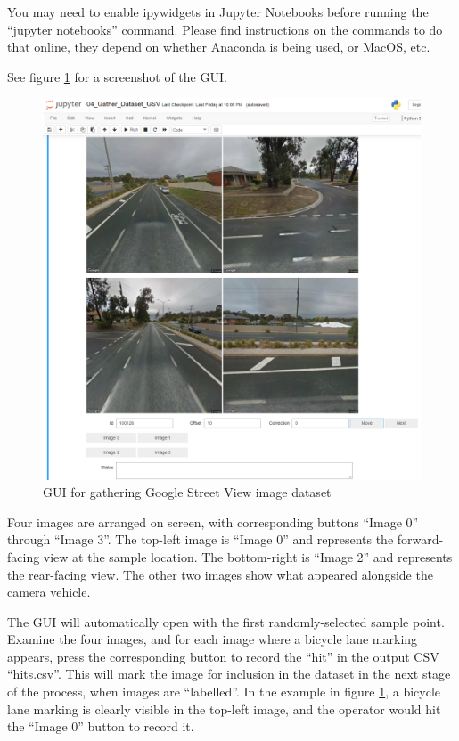 \documentclass[11pt,twoside]{report}
\begin{document}
You may need to enable ipywidgets in Jupyter Notebooks before running the ``jupyter notebooks'' command.  Please find instructions on the commands to do that online, they depend on whether Anaconda is being used, or MacOS, etc.

See figure \ref{fig:gui} for a screenshot of the GUI.

\begin{figure}[h]
\centering
\includegraphics[scale=0.25]{a001_gui.png}
\caption{GUI for gathering Google Street View image dataset}
\label{fig:gui}
\end{figure}

Four images are arranged on screen, with corresponding buttons ``Image 0'' through ``Image 3''.  The top-left image is ``Image 0'' and represents the forward-facing view at the sample location.  The bottom-right is ``Image 2'' and represents the rear-facing view.  The other two images show what appeared alongside the camera vehicle.

The GUI will automatically open with the first randomly-selected sample point.  Examine the four images, and for each image where a bicycle lane marking appears, press the corresponding button to record the ``hit'' in the output CSV ``hits.csv''.  This will mark the image for inclusion in the dataset in the next stage of the process, when images are ``labelled''.  In the example in figure \ref{fig:gui}, a bicycle lane marking is clearly visible in the top-left image, and the operator would hit the ``Image 0'' button to record it.
\end{document}
